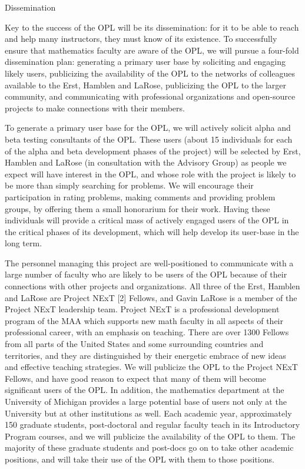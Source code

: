 \documentclass[11pt]{article}
\begin{document}
\begin{section}{Dissemination}

Key to the success of the OPL will be its dissemination: for it to be able
to reach and help many instructors, they must know of its existence.  To
successfully ensure that mathematics faculty are aware of the OPL, we will
pursue a four-fold dissemination plan: generating a primary user base by
soliciting and engaging likely users, publicizing the availability of the
OPL to the networks of colleagues available to the Erst, Hamblen and
LaRose, publicizing the OPL to the larger community, and communicating
with professional organizations and open-source projects to make
connections with their members.

To generate a primary user base for the OPL, we will actively solicit
alpha and beta testing consultants of the OPL.  These users (about 15
individuals for each of the alpha and beta development phases of the
project) will be selected by Erst, Hamblen and LaRose (in consultation
with the Advisory Group) as people we expect will have interest in the
OPL, and whose role with the project is likely to be more than simply
searching for problems.  We will encourage their participation in rating
problems, making comments and providing problem groups, by offering them a
small honorarium for their work.  Having these individuals will provide a
critical mass of actively engaged users of the OPL in the critical phases
of its development, which will help develop its user-base in the long
term.

The personnel managing this project are well-positioned to communicate
with a large number of faculty who are likely to be users of the OPL
because of their connections with other projects and organizations.  All
three of the Erst, Hamblen and LaRose are Project NExT [2]
Fellows, and Gavin LaRose is a member of the Project NExT leadership team.
Project NExT is a professional development program of the MAA which
supports new math faculty in all aspects of their professional career,
with an emphasis on teaching.  There are over 1300 Fellows from all parts
of the United States and some surrounding countries and territories, and
they are distinguished by their energetic embrace of new ideas and
effective teaching strategies.  We will publicize the OPL to the Project
NExT Fellows, and have good reason to expect that many of them will become
significant users of the OPL.  In addition, the mathematics department at
the University of Michigan provides a large potential base of users not
only at the University but at other institutions as well.  Each academic
year, approximately 150 graduate students, post-doctoral and regular
faculty teach in its Introductory Program courses, and we will publicize
the availability of the OPL to them.  The majority of these graduate
students and post-docs go on to take other academic positions, and will
take their use of the OPL with them to those positions.


\end{section}
\end{document}
